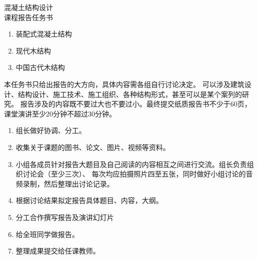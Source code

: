 \documentclass[12pt]{article}
\newcommand{\xiaochuhao}{\fontsize{36pt}{\baselineskip}\selectfont} %
\newcommand{\yihao}{\fontsize{28pt}{\baselineskip}\selectfont}      %
\begin{document}
\par{\vspace{4cm}}

\begin{center}
{\heiti \xiaochuhao 混凝土结构设计}\\\vspace{.7cm}
{\heiti \yihao 课程报告任务书}
\end{center}
\newpage


\begin{enumerate}
\item 装配式混凝土结构
\item 现代木结构
\item 中国古代木结构
\end{enumerate}
\indent 本任务书只给出报告的大方向，具体内容需各组自行讨论决定。
可以涉及建筑设计、结构设计、施工技术、施工组织、各种结构形式，甚至可以是某个案列的研究。
报告涉及的内容既不要过大也不要过小。最终提交纸质报告书不少于60页，课堂演讲至少20分钟不超过30分钟。
\par{}
\vspace{.5cm}

\begin{enumerate}
\item 组长做好协调、分工。
\item 收集关于课题的图书、论文、图片、视频等资料。
\item 小组各成员针对报告大题目及自己阅读的内容相互之间进行交流。组长负责组织讨论会（至少三次）、
      每次均应拍摄照片四至五张，同时做好小组讨论的音频录制，然后整理出讨论记录。
\item 根据讨论结果拟定报告具体题目、内容，大纲。
\item 分工合作撰写报告及演讲幻灯片
\item 给全班同学做报告。
\item 整理成果提交给任课教师。
\end{enumerate}
\end{document}
